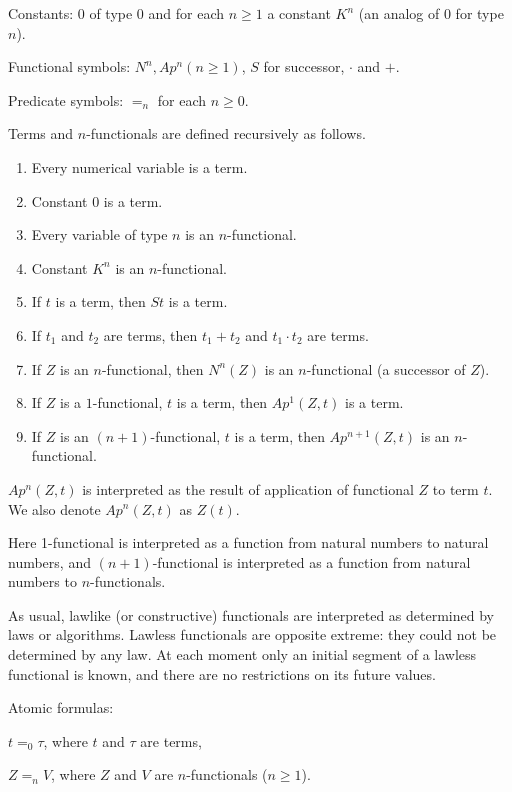 \documentclass{asl}
\theoremstyle{definition}
\begin{document}
Constants: 0 of type 0 and for each $n\geqslant 1$ a constant $K^n$ (an analog of 0 for type $ n $).
\smallskip

Functional symbols: $N^n,Ap^n (n\geqslant 1) $, $S$ for successor, $\cdot$ and $+$.

\smallskip 
Predicate  symbols: $=_n$ for each $n\geqslant 0$.

\medskip
Terms and $n$-functionals are defined recursively as follows.
\begin{enumerate}
\item Every numerical variable is a term.
\item Constant 0 is a term.
\item Every variable of type $ n $ is an $ n $-functional.
\item Constant $ K^n $ is an $ n $-functional.
\item If $t$ is a term, then $St$ is a term.
\item If $t_1$ and $t_2$ are terms, then $t_1+t_2$ and $t_1\cdot t_2$ are terms.
\item If $Z$ is an $n$-functional, then $ N^n(Z) $ is an $n$-functional (a successor of $Z$).
\item If $Z$ is a $1$-functional, $t$ is a term, then $Ap^1(Z,t) $ is a term.
\item If $Z$ is an $(n+1)$-functional, $t$ is a term, then $ Ap^{n+1}(Z,t) $
 is an $n$-functional.
\end{enumerate}

$ Ap^n(Z,t) $ is interpreted as the result of application of functional $ Z $ to term $ t $. We also denote $ Ap^n(Z,t) $ as $Z(t)$.

Here 1-functional is interpreted as a function from natural numbers to natural numbers, and $ (n+1) $-functional is interpreted as a function from natural numbers to $n$-functionals.

As usual, lawlike (or constructive) functionals are interpreted as determined by laws or algorithms.
Lawless functionals are opposite extreme: they could not be determined by any law. At each moment only an initial segment of a lawless functional is known, and there are no restrictions on its future values.
\smallskip

Atomic formulas:
\begin{list}{}{}
\item $ t=_0\tau$, where $t$ and $\tau$ are terms,
\item $ Z=_nV $, where $Z$ and $V$ are  $n$-functionals ($ n\geqslant1 $).
\end{list}
\end{document}
